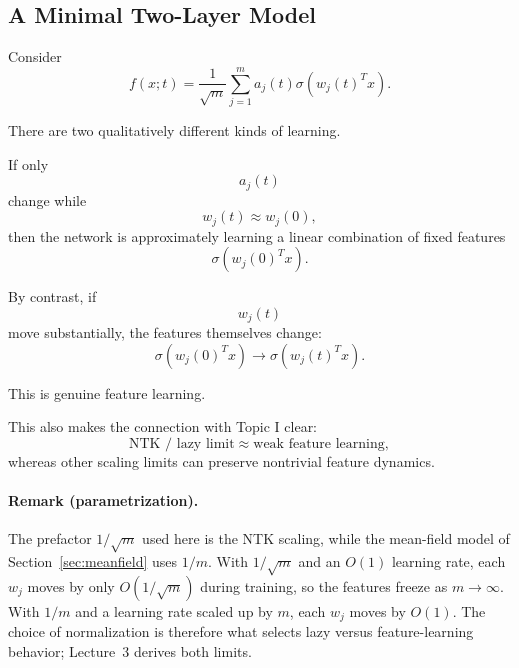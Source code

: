 \subsection{A Minimal Two-Layer Model}

Consider
\begin{equation}
    f(x;t)
    =
    \frac{1}{\sqrt m}
    \sum_{j=1}^{m}
    a_j(t)
    \sigma\!\left(
        w_j(t)^T x
    \right).
\end{equation}

There are two qualitatively different kinds of learning.

If only
\begin{equation}
    a_j(t)
\end{equation}
change while
\begin{equation}
    w_j(t)\approx w_j(0),
\end{equation}
then the network is approximately learning a linear combination of fixed
features
\begin{equation}
    \sigma(w_j(0)^T x).
\end{equation}

By contrast, if
\begin{equation}
    w_j(t)
\end{equation}
move substantially, the features themselves change:
\begin{equation}
    \sigma(w_j(0)^Tx)
    \longrightarrow
    \sigma(w_j(t)^Tx).
\end{equation}

This is genuine feature learning.

This also makes the connection with Topic I clear:
\begin{equation}
    \boxed{
    \text{NTK / lazy limit}
    \approx
    \text{weak feature learning},
    }
\end{equation}
whereas other scaling limits can preserve nontrivial feature dynamics.

\paragraph{Remark (parametrization).}
The prefactor $1/\sqrt m$ used here is the NTK scaling, while the mean-field
model of Section~\ref{sec:meanfield} uses $1/m$. With $1/\sqrt m$ and an
$O(1)$ learning rate, each $w_j$ moves by only $O(1/\sqrt m)$ during training,
so the features freeze as $m\to\infty$. With $1/m$ and a learning rate scaled
up by $m$, each $w_j$ moves by $O(1)$. The choice of normalization is
therefore what selects lazy versus feature-learning behavior; Lecture~3
derives both limits.


